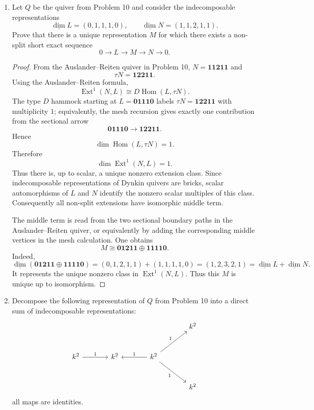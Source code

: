 \documentclass[11pt, a4paper]{article}
\newcommand{\Hom}{\operatorname{Hom}}
\newcommand{\Ext}{\operatorname{Ext}}
\newcommand{\vect}[1]{\mathbf{#1}}
\newcommand{\ddim}{\underline{\dim}}
\begin{document}
\begin{enumerate}[leftmargin=*, label=\textbf{\arabic*.}]
\item Let $Q$ be the quiver from Problem 10 and consider the indecomposable representations
\[
\ddim L=(0,1,1,1,0),
\qquad
\ddim N=(1,1,2,1,1).
\]
Prove that there is a unique representation $M$ for which there exists a non-split short exact sequence
\[
0\to L\to M\to N\to 0.
\]

\begin{proof}
From the Auslander--Reiten quiver in Problem 10, $N=\vect{11211}$ and
\[
\tau N=\vect{12211}.
\]
Using the Auslander--Reiten formula,
\[
\Ext^1(N,L)\cong D\Hom(L,\tau N).
\]
The type $D$ hammock starting at $L=\vect{01110}$ labels
$\tau N=\vect{12211}$ with multiplicity $1$; equivalently, the mesh recursion
gives exactly one contribution from the sectional arrow
\[
\vect{01110}\longrightarrow \vect{12211}.
\]
Hence
\[
\dim\Hom(L,\tau N)=1.
\]
Therefore
\[
\dim\Ext^1(N,L)=1.
\]
Thus there is, up to scalar, a unique nonzero extension class. Since
indecomposable representations of Dynkin quivers are bricks, scalar
automorphisms of $L$ and $N$ identify the nonzero scalar multiples of this
class. Consequently all non-split extensions have isomorphic middle term.

The middle term is read from the two sectional boundary paths in the Auslander--Reiten quiver, or equivalently by adding the corresponding middle vertices in the mesh calculation. One obtains
\[
M\cong \vect{01211}\oplus\vect{11110}.
\]
Indeed,
\[
\ddim(\vect{01211}\oplus\vect{11110})=(0,1,2,1,1)+(1,1,1,1,0)=(1,2,3,2,1)=\ddim L+\ddim N.
\]
It represents the unique nonzero class in $\Ext^1(N,L)$. Thus this $M$ is
unique up to isomorphism.
\end{proof}

\item Decompose the following representation of $Q$ from Problem 10 into a direct sum of indecomposable representations:
\[
\begin{tikzcd}[column sep=large,row sep=large]
&&&k^2\\
k^2\arrow[r,"1"]&k^2&k^2\arrow[l,"1"']\arrow[ur,"1"]\arrow[dr,"1"']&\\
&&&k^2
\end{tikzcd}
\]
all maps are identities.


\end{enumerate}
\end{document}
